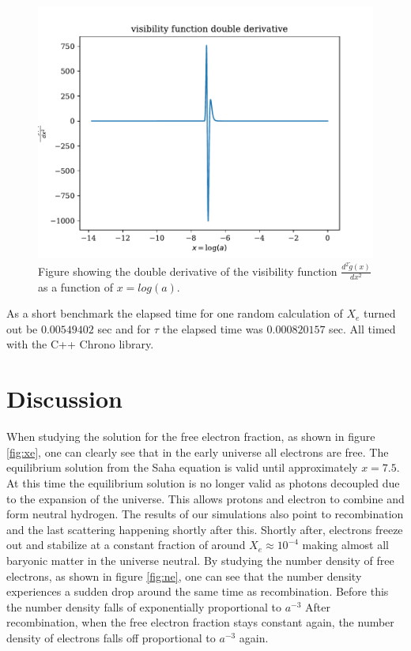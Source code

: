 \documentclass[onecolumn]{aastex62}
\begin{document}
\begin{figure}
    \includegraphics[scale=0.8]{figures/ddgdxx.pdf}
    \caption{Figure showing the double derivative of the visibility function $\frac{d^2\widetilde{g}(x)}{dx^2}$ as a function of $x=log(a)$.}
    \label{fig:ddgdxx}
\end{figure}
As a short benchmark the elapsed time for one random calculation of $X_e$ turned out be $0.00549402$ sec and for $\tau$ the elapsed time was $0.000820157$ sec. All timed with the C++ Chrono library.
\section{Discussion}\label{sec:discussion}
When studying the solution for the free electron fraction, as shown in figure \ref{fig:xe}, one can clearly see that in the early universe all electrons are free. The equilibrium solution from the Saha equation is valid until approximately $x=7.5$. At this time the equilibrium solution is no longer valid as photons decoupled due to the expansion of the universe. This allows protons and electron to combine and form neutral hydrogen. The results of our simulations also point to recombination and the last scattering happening shortly after this. Shortly after, electrons freeze out and stabilize at a constant fraction of around $X_e\approx10^{-4}$ making almost all baryonic matter in the universe neutral. By studying the number density of free electrons, as shown in figure \ref{fig:ne}, one can see that the number density experiences a sudden drop around the same time as recombination. Before this the number density falls of exponentially proportional to $a^{-3}$ After recombination, when the free electron fraction stays constant again, the number density of electrons falls off proportional to $a^{-3}$ again.





\end{document}
